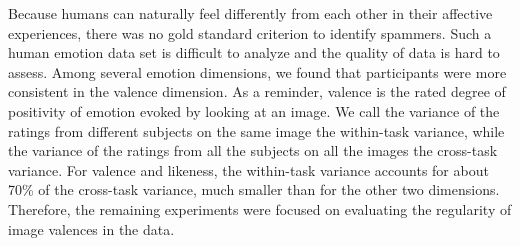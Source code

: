 \documentclass[10pt,journal,letterpaper,compsoc,twoside]{IEEEtran}
\begin{document}
Because humans can naturally feel differently from each other in their affective experiences, there was no gold standard criterion to identify spammers.
Such a human emotion data set is difficult to analyze and 
the quality of data is hard to assess. Among several emotion dimensions,
we found that participants were more consistent in the valence dimension. 
As a reminder, valence is the rated degree of positivity of emotion
evoked by looking at an image. We call the variance of the ratings from different subjects on the same image the within-task variance, while the variance of the ratings from all the subjects on all the images the cross-task variance. For valence and likeness, the within-task variance accounts for about 70\% of the cross-task variance,
much smaller than for the other two dimensions. 
Therefore, the remaining experiments were focused on 
evaluating the regularity of image valences in the data.
\end{document}
